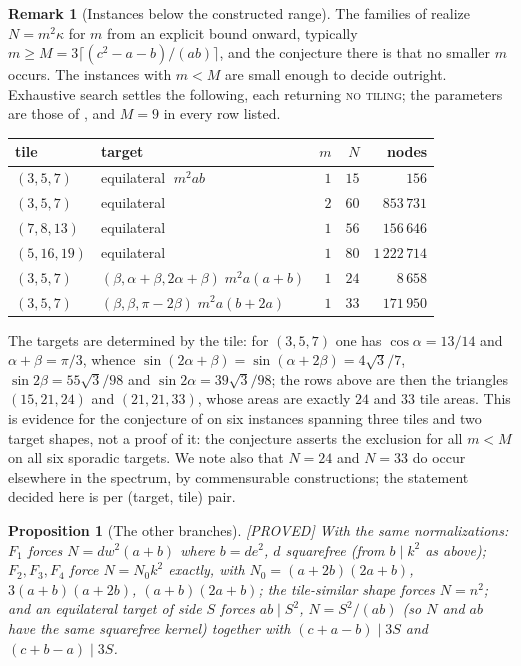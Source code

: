\documentclass[11pt,reqno]{amsart}
\theoremstyle{plain}
\newtheorem{proposition}[theorem]{Proposition}
\theoremstyle{definition}
\newtheorem{remark}[theorem]{Remark}
\newcommand{\lab}[1]{\hfill\textnormal{\footnotesize\textsc{[#1]}}}
\begin{document}
\begin{remark}[Instances below the constructed range]\label{rem:zhangsmall}
The families of \cite{Zhang} realize $N=m^2\kappa$ for $m$ from an explicit bound onward, typically
$m\ge M=3\lceil (c^2-a-b)/(ab)\rceil$, and the conjecture there is that no smaller $m$ occurs. The
instances with $m<M$ are small enough to decide outright. Exhaustive search settles the following,
each returning \textsc{no tiling}; the parameters are those of \cite[Table 1]{Zhang}, and $M=9$ in
every row listed.
\begin{center}
\begin{tabular}{llrrr}
\hline
tile & target & $m$ & $N$ & nodes\\
\hline
$(3,5,7)$   & equilateral $\;m^2ab$                       & $1$ & $15$  & $156$\\
$(3,5,7)$   & equilateral                                  & $2$ & $60$  & $853\,731$\\
$(7,8,13)$  & equilateral                                  & $1$ & $56$  & $156\,646$\\
$(5,16,19)$ & equilateral                                  & $1$ & $80$  & $1\,222\,714$\\
$(3,5,7)$   & $(\beta,\alpha+\beta,2\alpha+\beta)\;m^2a(a+b)$ & $1$ & $24$  & $8\,658$\\
$(3,5,7)$   & $(\beta,\beta,\pi-2\beta)\;m^2a(b+2a)$        & $1$ & $33$  & $171\,950$\\
\hline
\end{tabular}
\end{center}
The targets are determined by the tile: for $(3,5,7)$ one has $\cos\alpha=13/14$ and
$\alpha+\beta=\pi/3$, whence $\sin(2\alpha+\beta)=\sin(\alpha+2\beta)=4\sqrt3/7$,
$\sin2\beta=55\sqrt3/98$ and $\sin2\alpha=39\sqrt3/98$; the rows above are then the triangles
$(15,21,24)$ and $(21,21,33)$, whose areas are exactly $24$ and $33$ tile areas. This is evidence for
the conjecture of \cite{Zhang} on six instances spanning three tiles and two target shapes, not a
proof of it: the conjecture asserts the exclusion for all $m<M$ on all six sporadic targets. We note
also that $N=24$ and $N=33$ do occur elsewhere in the spectrum, by commensurable constructions; the
statement decided here is per (target, tile) pair.
\end{remark}

\begin{proposition}[The other branches]\label{prop:otherspectra}\lab{PROVED}
With the same normalizations:
$F_1$ forces $N=dw^2(a+b)$ where $b=de^2$, $d$ squarefree (from $b\mid k^2$ as above);
$F_2,F_3,F_4$ force $N=N_0k^2$ exactly, with $N_0=(a+2b)(2a+b)$, $3(a+b)(a+2b)$, $(a+b)(2a+b)$;
the tile-similar shape forces $N=n^2$; and an equilateral target of side $S$ forces $ab\mid S^2$,
$N=S^2/(ab)$ (so $N$ and $ab$ have the same squarefree kernel) together with
$(c+a-b)\mid 3S$ and $(c+b-a)\mid 3S$.
\end{proposition}
\end{document}
